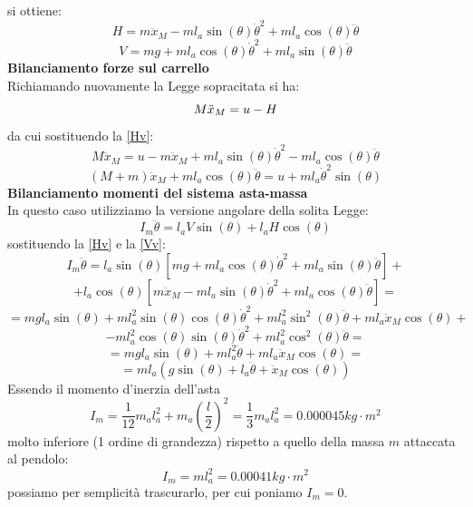si ottiene:
\begin{equation}\label{Hv}
H=m\ddot{x}_M-ml_a\sin(\theta)\dot{\theta}^2+ml_a\cos(\theta)\ddot{\theta}
\end{equation}
\begin{equation}\label{Vv}
V=mg+ml_a\cos(\theta)\dot{\theta}^2+ml_a\sin(\theta)\ddot{\theta}
\end{equation}
\textbf{Bilanciamento forze sul carrello}\\
Richiamando nuovamente la Legge sopracitata si ha:
\begin{equation}\notag
M\ddot{x}_M=u-H
\end{equation}
da cui sostituendo la \ref{Hv}:
$$
M\ddot{x}_M=u-m\ddot{x}_M+ml_a\sin(\theta)\dot{\theta}^2-ml_a\cos(\theta)\ddot{\theta}
$$
\begin{equation}\label{FCarr}
(M+m)\ddot{x}_M+ml_a\cos(\theta)\ddot{\theta}=u+ml_a\dot{\theta}^2\sin(\theta)
\end{equation} 
\textbf{Bilanciamento momenti del sistema asta-massa}\\
In questo caso utilizziamo la versione angolare della solita Legge:
\begin{equation}
I_m\ddot{\theta}=l_aV\sin(\theta)+l_aH\cos(\theta)
\end{equation}
sostituendo la \ref{Hv} e la \ref{Vv}:
$$
I_m\ddot{\theta}=l_a\sin(\theta)[mg+ml_a\cos(\theta)\dot{\theta}^2+ml_a\sin(\theta)\ddot{\theta}]+$$$$+l_a\cos(\theta)[m\ddot{x}_M-ml_a\sin(\theta)\dot{\theta}^2+ml_a\cos(\theta)\ddot{\theta}]=
$$
$$
=mgl_a\sin(\theta)+ml_a^2\sin(\theta)\cos(\theta)\dot{\theta}^2+ml_a^2\sin^2(\theta)\ddot{\theta}+ml_a\ddot{x}_M\cos(\theta)+$$$$-ml_a^2\cos(\theta)\sin(\theta)\dot{\theta}^2
+ml_a^2\cos^2(\theta)\ddot{\theta}=$$
$$=mgl_a\sin(\theta)+ml_a^2\ddot{\theta}+ml_a\ddot{x}_M\cos(\theta) =
$$
\begin{equation} \label{momInThetaP}
=ml_a(g\sin(\theta)+l_a\ddot{\theta}+\ddot{x}_M\cos(\theta))
\end{equation}
Essendo il momento d'inerzia dell'asta $$
I_m=\displaystyle\frac{1}{12}m_al_a^2+m_a(\displaystyle\frac{l}{2})^2=\displaystyle\frac{1}{3}m_al_a^2=0.000045kg\cdot m^2$$molto inferiore (1 ordine di grandezza) rispetto a quello della massa $m$ attaccata al pendolo: $$
I_m=ml_a^2=0.00041kg\cdot m^2$$ possiamo per semplicità trascurarlo, per cui poniamo $I_m=0$.

